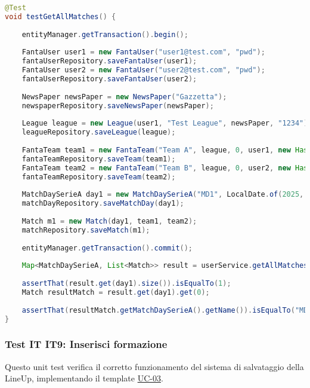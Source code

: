 \begin{lstlisting}[language=Java]
@Test
void testGetAllMatches() {
		
	entityManager.getTransaction().begin();
		
	FantaUser user1 = new FantaUser("user1@test.com", "pwd");
	fantaUserRepository.saveFantaUser(user1);
	FantaUser user2 = new FantaUser("user2@test.com", "pwd");
	fantaUserRepository.saveFantaUser(user2);
		
	NewsPaper newsPaper = new NewsPaper("Gazzetta");
	newspaperRepository.saveNewsPaper(newsPaper);
		
	League league = new League(user1, "Test League", newsPaper, "1234");
	leagueRepository.saveLeague(league);
		
	FantaTeam team1 = new FantaTeam("Team A", league, 0, user1, new HashSet<Contract>());
	fantaTeamRepository.saveTeam(team1);
	FantaTeam team2 = new FantaTeam("Team B", league, 0, user2, new HashSet<Contract>());
	fantaTeamRepository.saveTeam(team2);
		
	MatchDaySerieA day1 = new MatchDaySerieA("MD1", LocalDate.of(2025, 9, 7));
	matchDayRepository.saveMatchDay(day1);
		
	Match m1 = new Match(day1, team1, team2);
	matchRepository.saveMatch(m1);
		
	entityManager.getTransaction().commit();
		
	Map<MatchDaySerieA, List<Match>> result = userService.getAllMatches(league);		
		
	assertThat(result.get(day1).size()).isEqualTo(1);
	Match resultMatch = result.get(day1).get(0);
		
	assertThat(resultMatch.getMatchDaySerieA().getName()).isEqualTo("MD1");
}
\end{lstlisting}


\subsubsection{Test IT IT9: Inserisci formazione} \label{IT9}

Questo unit test verifica il corretto funzionamento del sistema di salvataggio della LineUp,
implementando il template \hyperref[UC-03]{UC-03}.

